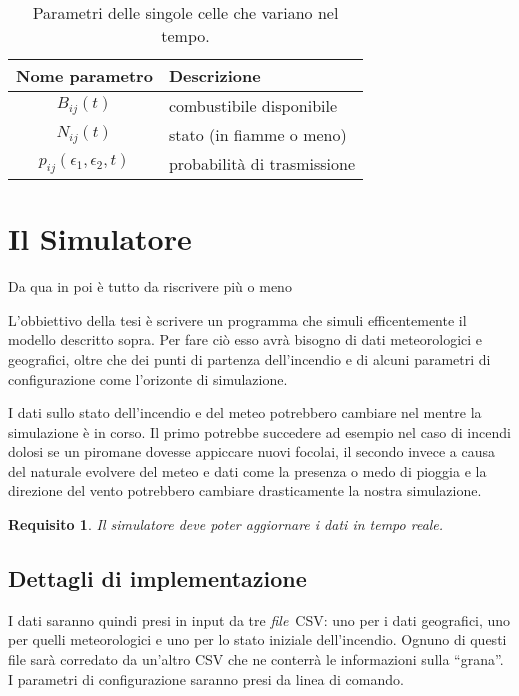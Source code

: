 \documentclass[draft]{article}
\newcommand{\file}{\textit{file}}
\newtheorem{requirement}{Requisito}
\begin{document}
\begin{table}
\centering
\begin{tabular}{|c|l|}
	\hline
	\textbf{Nome parametro} & \textbf{Descrizione}\\
	\hline
	$B_{ij}(t)$ & combustibile disponibile\\
	$N_{ij}(t)$ & stato (in fiamme o meno)\\
	$p_{ij}(\epsilon_1, \epsilon_2, t)$ & probabilità di trasmissione\\
	\hline
\end{tabular}
\caption{Parametri delle singole celle che variano nel tempo.}
\label{tab:dynamic}
\end{table}


\section{Il Simulatore}

Da qua in poi è tutto da riscrivere più o meno

\noindent\hrulefill

L'obbiettivo della tesi è scrivere un programma che simuli efficentemente il
modello descritto sopra. Per fare ciò esso avrà bisogno di dati meteorologici e
geografici, oltre che dei punti di partenza dell'incendio e di alcuni parametri
di configurazione come l'orizonte di simulazione.

I dati sullo stato dell'incendio e del meteo potrebbero cambiare nel mentre la
simulazione è in corso. Il primo potrebbe succedere ad esempio nel caso di
incendi dolosi se un piromane dovesse appiccare nuovi focolai, il secondo
invece a causa del naturale evolvere del meteo e dati come la presenza o medo di
pioggia e la direzione del vento potrebbero cambiare drasticamente la nostra
simulazione.

\begin{requirement}
Il simulatore deve poter aggiornare i dati in tempo reale.
\end{requirement}

\subsection{Dettagli di implementazione}

I dati saranno quindi presi in input da tre \file\ CSV: uno per i dati
geografici, uno per quelli meteorologici e uno per lo stato iniziale
dell'incendio.  Ognuno di questi file sarà corredato da un'altro CSV che ne
conterrà le informazioni sulla ``grana''. I parametri di configurazione saranno
presi da linea di comando.
\end{document}
